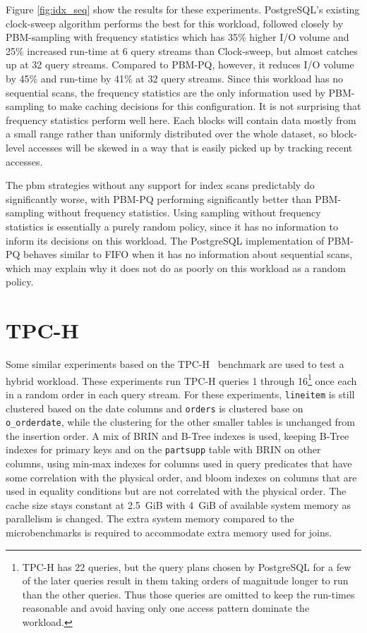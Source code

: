 Figure \ref{fig:idx_seq} show the results for these experiments. PostgreSQL's existing clock-sweep algorithm performs the best for this workload, followed closely by PBM-sampling with frequency statistics which has 35\% higher I/O volume and 25\% increased run-time at 6 query streams than Clock-sweep, but almost catches up at 32 query streams. Compared to PBM-PQ, however, it reduces I/O volume by 45\% and run-time by 41\% at 32 query streams. Since this workload has no sequential scans, the frequency statistics are the only information used by PBM-sampling to make caching decisions for this configuration. It is not surprising that frequency statistics perform well here. Each blocks will contain data mostly from a small range rather than uniformly distributed over the whole dataset, so block-level accesses will be skewed in a way that is easily picked up by tracking recent accesses.

The \gls{pbm} strategies without any support for index scans predictably do significantly worse, with PBM-PQ performing significantly better than PBM-sampling without frequency statistics. Using sampling without frequency statistics is essentially a purely random policy, since it has no information to inform its decisions on this workload. The PostgreSQL implementation of PBM-PQ behaves similar to FIFO when it has no information about sequential scans, which may explain why it does not do as poorly on this workload as a random policy.


\section{TPC-H}

Some similar experiments based on the TPC-H~\cite{tpch} benchmark are used to test a hybrid workload. These experiments run TPC-H queries 1 through 16\footnote{TPC-H has 22 queries, but the query plans chosen by PostgreSQL for a few of the later queries result in them taking orders of magnitude longer to run than the other queries. Thus those queries are omitted to keep the run-times reasonable and avoid having only one access pattern dominate the workload.} once each in a random order in each query stream. For these experiments, \verb|lineitem| is still clustered based on the date columns and \verb|orders| is clustered base on \verb|o_orderdate|, while the clustering for the other smaller tables is unchanged from the insertion order. A mix of BRIN and B-Tree indexes is used, keeping B-Tree indexes for primary keys and on the \verb|partsupp| table with BRIN on other columns, using min-max indexes for columns used in query predicates that have some correlation with the physical order, and bloom indexes on columns that are used in equality conditions but are not correlated with the physical order. The cache size stays constant at 2.5~GiB with 4~GiB of available system memory as parallelism is changed. The extra system memory compared to the microbenchmarks is required to accommodate extra memory used for joins.

